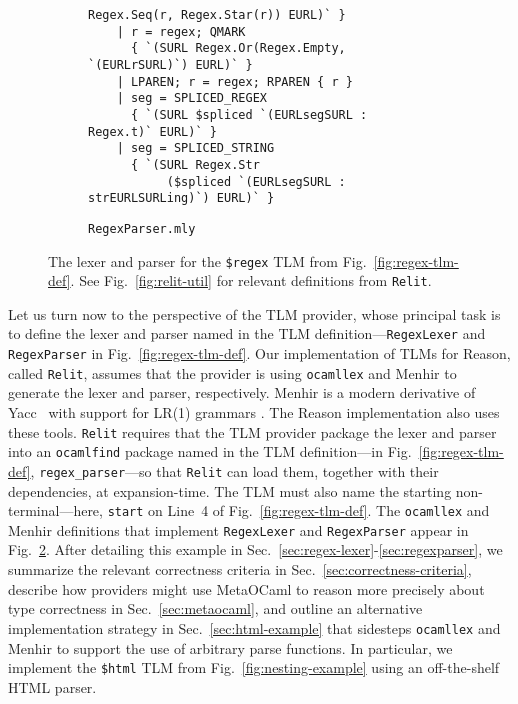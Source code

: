 \documentclass[acmsmall]{acmart}
\newcommand{\li}[1]{\lstinline[basicstyle=\ttfamily\fontsize{9pt}{1em}\selectfont]{#1}}
\begin{document}
\begin{figure}
\begin{subfigure}[t]{0.61\textwidth}
\begin{lstlisting}[morekeywords={token,left,start},stringstyle=\ttfamily\color{black}]
           Regex.Seq(r, Regex.Star(r)) EURL)` }
    | r = regex; QMARK 
      { `(SURL Regex.Or(Regex.Empty, `(EURLrSURL)`) EURL)` }
    | LPAREN; r = regex; RPAREN { r }
    | seg = SPLICED_REGEX 
      { `(SURL $spliced `(EURLsegSURL : Regex.t)` EURL)` }
    | seg = SPLICED_STRING 
      { `(SURL Regex.Str
           ($spliced `(EURLsegSURL : strEURLSURLing)`) EURL)` }
\end{lstlisting}
\vspace{-5px}
\caption{\li{RegexParser.mly}}
\label{fig:regex-parser}
\end{subfigure}
\vspace{1px}
\caption{The lexer and parser for the \li{$regex} TLM from Fig.~\ref{fig:regex-tlm-def}. See Fig.~\ref{fig:relit-util} for relevant definitions from \li{Relit}.}
\label{fig:lexer-and-parser}
\vspace{-7px}
\end{figure}

Let us turn now to the perspective of the TLM provider, whose principal task is to define the lexer and parser named in the TLM definition---\li{RegexLexer} and \li{RegexParser} in Fig.~\ref{fig:regex-tlm-def}. Our implementation of TLMs for Reason, called \li{Relit}, assumes that the provider is using \li{ocamllex} \cite{ocaml-manual} and Menhir  \cite{pottier2016menhir,DBLP:journals/entcs/PottierR06} to generate the lexer and parser, respectively. Menhir is a modern derivative of Yacc~\cite{johnson1975yacc} with support for LR(1) grammars \cite{jourdan2012validating,DBLP:journals/entcs/PottierR06}. The Reason implementation also uses these tools. \li{Relit} requires that the TLM provider package the lexer and parser into an \li{ocamlfind} package named in the TLM definition---in Fig.~\ref{fig:regex-tlm-def}, \li{regex_parser}---so that \li{Relit} can load them, together with their dependencies, at expansion-time. The TLM must also name the starting non-terminal---here, \li{start} on Line~4 of Fig.~\ref{fig:regex-tlm-def}. 
The \li{ocamllex} and Menhir definitions that implement \li{RegexLexer} and \li{RegexParser} appear in Fig.~\ref{fig:lexer-and-parser}. 
After detailing this example in Sec.~\ref{sec:regex-lexer}-\ref{sec:regexparser}, we summarize the relevant correctness criteria in Sec.~\ref{sec:correctness-criteria}, describe how providers might use MetaOCaml to reason more precisely about type correctness in Sec.~\ref{sec:metaocaml}, and outline an alternative implementation strategy in Sec.~\ref{sec:html-example} that sidesteps \li{ocamllex} and Menhir to support the use of arbitrary parse functions. In particular, we implement the \li{$html} TLM from Fig.~\ref{fig:nesting-example} using an off-the-shelf HTML parser.
\end{document}
